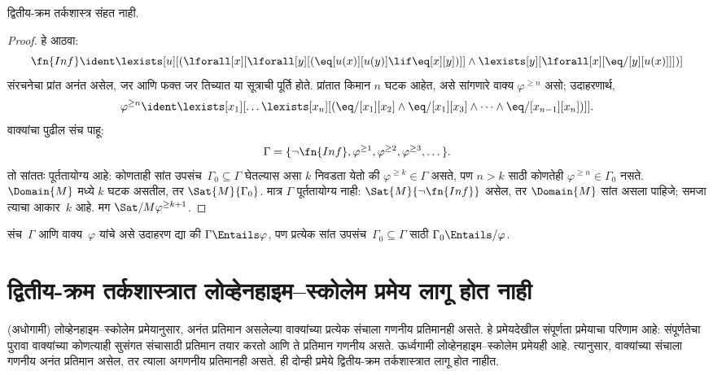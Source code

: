 \begin{thm}
\label{sol:met:com:thm:sol-not-compact}
द्वितीय-क्रम तर्कशास्त्र संहत नाही.
\end{thm}

\begin{proof}
हे आठवा:
\[\fn{Inf} \ident \lexists[u][(\lforall[x][\lforall[y][(\eq[u(x)][u(y)]
      \lif \eq[x][y])]] \land \lexists[y][\lforall[x][\eq/[y][u(x)]]])]
\]
संरचनेचा प्रांत अनंत असेल, जर आणि फक्त जर
तिच्यात या सूत्राची पूर्ति होते. प्रांतात किमान
$n$ घटक आहेत, असे सांगणारे वाक्य
$\varphi^{\ge n}$ असो; उदाहरणार्थ,
\[\varphi^{\ge n} \ident \lexists[x_1][\dots\lexists[x_n][(\eq/[x_1][x_2]
    \land \eq/[x_1][x_3] \land \dots \land \eq/[x_{n-1}][x_n])]].
\]
वाक्यांचा पुढील संच पाहू:
\[\Gamma = \{\lnot \fn{Inf}, \varphi^{\ge 1}, \varphi^{\ge 2}, \varphi^{\ge 3}, \dots\}.
\]
तो सांततः पूर्ततायोग्य आहे: कोणताही सांत उपसंच~$\Gamma_0
\subseteq \Gamma$ घेतल्यास असा $k$ निवडता येतो की
$\varphi^{\ge k} \in \Gamma$ असते, पण $n>k$ साठी
कोणतेही $\varphi^{\ge n} \in \Gamma_0$ नसते.
$\Domain{M}$ मध्ये $k$ घटक असतील, तर
$\Sat{M}{\Gamma_0}$. मात्र $\Gamma$ पूर्ततायोग्य
नाही: $\Sat{M}{\lnot \fn{Inf}}$ असेल, तर
$\Domain{M}$ सांत असला पाहिजे; समजा त्याचा
आकार~$k$ आहे. मग $\Sat/{M}{\varphi^{\ge k+1}}$.
\end{proof}

\begin{prob}
संच~$\Gamma$ आणि वाक्य~$\varphi$ यांचे असे
उदाहरण द्या की $\Gamma \Entails \varphi$, पण प्रत्येक
सांत उपसंच~$\Gamma_0 \subseteq
\Gamma$ साठी $\Gamma_0 \Entails/ \varphi$.
\end{prob}













\section{द्वितीय-क्रम तर्कशास्त्रात लोव्हेनहाइम--स्कोलेम प्रमेय लागू होत नाही}\label{sol:met:lst:sec}

\begin{explain}
(अधोगामी) लोव्हेनहाइम--स्कोलेम प्रमेयानुसार, अनंत
प्रतिमान असलेल्या वाक्यांच्या प्रत्येक संचाला
गणनीय प्रतिमानही असते. हे प्रमेयदेखील
संपूर्णता प्रमेयाचा परिणाम आहे: संपूर्णतेचा पुरावा
वाक्यांच्या कोणत्याही सुसंगत संचासाठी प्रतिमान
तयार करतो आणि ते प्रतिमान गणनीय असते.
ऊर्ध्वगामी लोव्हेनहाइम--स्कोलेम प्रमेयही आहे.
त्यानुसार, वाक्यांच्या संचाला
गणनीय अनंत प्रतिमान असेल, तर त्याला
अगणनीय प्रतिमानही असते. ही दोन्ही
प्रमेये द्वितीय-क्रम तर्कशास्त्रात लागू होत नाहीत.
\end{explain}



